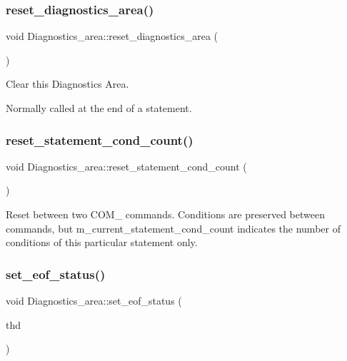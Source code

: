 \subsubsection{\texorpdfstring{reset\+\_\+diagnostics\+\_\+area()}{reset\_diagnostics\_area()}}
{\footnotesize\ttfamily void Diagnostics\+\_\+area\+::reset\+\_\+diagnostics\+\_\+area (\begin{DoxyParamCaption}{ }\end{DoxyParamCaption})}

Clear this Diagnostics Area.

Normally called at the end of a statement. \mbox{\label{classDiagnostics__area_abcfdd87b7a95d4e391114285141e1a53}} 
\subsubsection{\texorpdfstring{reset\+\_\+statement\+\_\+cond\+\_\+count()}{reset\_statement\_cond\_count()}}
{\footnotesize\ttfamily void Diagnostics\+\_\+area\+::reset\+\_\+statement\+\_\+cond\+\_\+count (\begin{DoxyParamCaption}{ }\end{DoxyParamCaption})\hspace{0.3cm}{\ttfamily [inline]}}

Reset between two C\+O\+M\+\_\+ commands. Conditions are preserved between commands, but m\+\_\+current\+\_\+statement\+\_\+cond\+\_\+count indicates the number of conditions of this particular statement only. \mbox{\label{classDiagnostics__area_a3b85cb8d8c79391a1612b1f03a92d7d6}} 
\subsubsection{\texorpdfstring{set\+\_\+eof\+\_\+status()}{set\_eof\_status()}}
{\footnotesize\ttfamily void Diagnostics\+\_\+area\+::set\+\_\+eof\+\_\+status (\begin{DoxyParamCaption}\item[{T\+HD $\ast$}]{thd }\end{DoxyParamCaption})}

